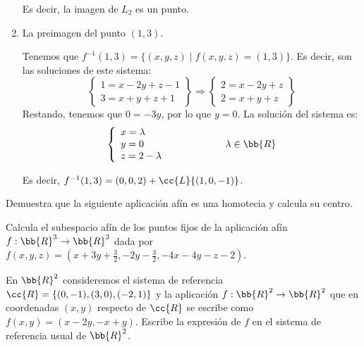 \begin{ejercicio}
\begin{enumerate}
        Es decir, la imagen de $L_2$ es un punto.

        \item La preimagen del punto $(1, 3)$.

        Tenemos que $f^{-1}(1,3) = \{(x,y,z)\mid f(x,y,z)=(1,3)\}$. Es decir, son las soluciones de este sistema:
        \begin{equation*}
            \left\{
            \begin{array}{l}
                1 = x-2y+z-1\\
                3 = x+y+z+1
            \end{array}
            \right\} \Longrightarrow
            \left\{
            \begin{array}{l}
                2 = x-2y+z\\
                2 = x+y+z
            \end{array}
            \right\}
        \end{equation*}
        Restando, tenemos que $0=-3y$, por lo que $y=0$. La solución del sistema es:
        \begin{equation*}
            \left\{
            \begin{array}{l}
                x = \lambda \\
                y = 0 \\
                z = 2-\lambda
            \end{array}
            \right. \hspace{2cm} \lambda\in \bb{R}
        \end{equation*}

        Es decir, $f^{-1}(1,3)=(0,0,2) + \cc{L}\{(1,0,-1)\}$.        
    \end{enumerate}
\end{ejercicio}

\begin{ejercicio}
    Demuestra que la siguiente aplicación afín es una homotecia y calcula su centro.
\end{ejercicio}

\begin{ejercicio}
    Calcula el subespacio afín de los puntos fijos de la aplicación afín $f : \bb{R}^3\to \bb{R}^3$ dada por $f (x, y, z) =\left(x + 3y + \frac{3}{2}, -2y - \frac{3}{2}, -4x - 4y - z - 2\right)$.
\end{ejercicio}

\begin{ejercicio}
    En $\bb{R}^2$ consideremos el sistema de referencia $\cc{R} = \{(0, -1), (3, 0), (-2, 1)\}$ y la aplicación $f : \bb{R}^2\to \bb{R}^2$ que en coordenadas $(x, y)$ respecto de $\cc{R}$ se escribe como $f (x, y) = (x-2y, -x+y)$. Escribe la expresión de $f$ en el sistema de referencia usual de $\bb{R}^2$.
\end{ejercicio}

